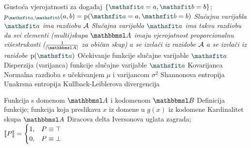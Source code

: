  {Gustoća vjerojatnosti za događaj $\cbr{\rvar a= a,\rvar b= b}$; $p_{\rvar a,\rvar b}(a,b)=\p(\rvar a= a,\rvar b= b)$}
 {\textit{Slučajna varijabla $\rvar a$ ima razdiobu $\mathcal{A}$}}
 	{\textit{Slučajna varijabla $\rvar a$ ima takvu razdiobu da svi elementi (multi)skupa $\set A$ imaju vjerojatnost proporcionalnu višestrukosti ($\frac{1}{\envert{\set A}}$ za običan skup)}}
 {\textit{$a$ se izvlači iz razidobe $\mathcal{A}$}}
 {\textit{$a$ se izvlači iz razidobe $\p(\rvar a)$}}
 {Očekivanje funkcije slučajne varijable $\rvar a$}
 {Disperzija (varijanca) funkcije slučajne varijable $\rvar a$}
		{Kovarijanca}
 {Normalna razdioba s učekivanjem $\mu$ i varijancom $\sigma^2$}
			{Shannonova entropija}
 {Unakrsna entropija}
		{Kullback-Leiblerova divergencija}

 {Funkcija s domenom $\set A$ i kodomenom $\set B$}
 {Definicija funkcije; funkcija koja preslikava $x$ iz domene u $g(x)$ iz kodomene}
	{Kardinalitet skupa $\set A$}
	{Diracova delta}
 {Iversonova uglata zagrada; $\enbbracket{P}=\begin{cases} 1, & P \equiv \top \\ 0, & P \equiv \bot \end{cases}$}
